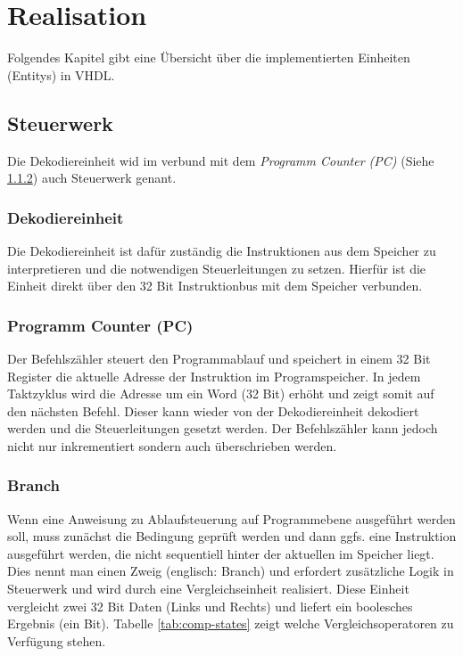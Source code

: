 \chapter{Realisation}

    Folgendes Kapitel gibt eine Übersicht über die implementierten Einheiten (Entitys) in VHDL.

    \section{Steuerwerk}
        Die Dekodiereinheit wid im verbund mit dem \textit{Programm Counter (PC)} (Siehe \ref{lab:pc}) auch Steuerwerk genant.

        \subsection{Dekodiereinheit}
            
            Die Dekodiereinheit ist dafür zuständig die Instruktionen aus dem Speicher zu interpretieren und die notwendigen
            Steuerleitungen zu setzen.
            Hierfür ist die Einheit direkt über den 32 Bit Instruktionbus mit dem Speicher verbunden.

        \subsection{Programm Counter (PC)}\label{lab:pc}
            Der Befehlszähler steuert den Programmablauf und speichert in einem 32 Bit Register
            die aktuelle Adresse der Instruktion im Programspeicher.
            In jedem Taktzyklus wird die Adresse um ein Word (32 Bit) erhöht und zeigt somit
            auf den nächsten Befehl. Dieser kann wieder von der Dekodiereinheit dekodiert werden
            und die Steuerleitungen gesetzt werden. Der Befehlszähler kann jedoch nicht nur
            inkrementiert sondern auch überschrieben werden.

            

        \subsection{Branch}
            Wenn eine Anweisung zu Ablaufsteuerung auf Programmebene
            ausgeführt werden soll, muss zunächst die Bedingung geprüft werden
            und dann ggfs. eine Instruktion ausgeführt werden,
            die nicht sequentiell hinter der aktuellen im Speicher liegt.
            Dies nennt man einen Zweig (englisch: Branch) und erfordert zusätzliche Logik in Steuerwerk 
            und wird durch eine Vergleichseinheit realisiert.
            Diese Einheit vergleicht zwei 32 Bit Daten (Links und Rechts) und liefert ein boolesches Ergebnis (ein Bit).
            Tabelle \ref{tab:comp-states} zeigt welche Vergleichsoperatoren zu Verfügung stehen.

